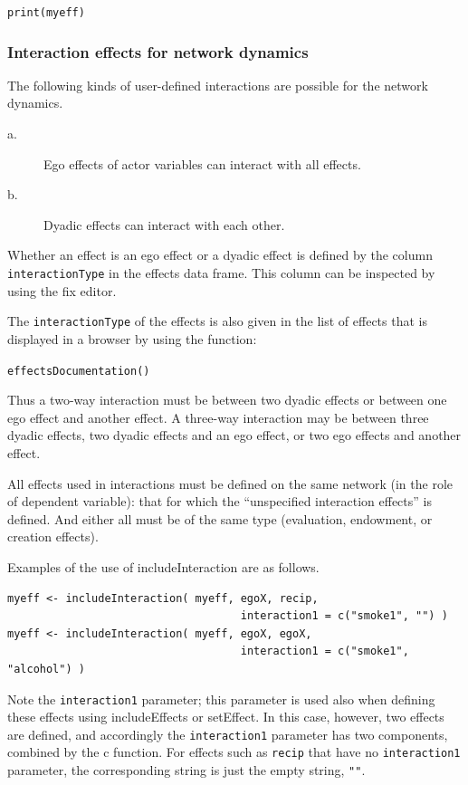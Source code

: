 \documentclass[a4paper,fleqn,11pt]{article}
\newcommand{\+}{\, + \,}
\newcommand{\sfn}[1]{\textsf{#1}}
\begin{document}
\verb|print(myeff)| \\


\subsubsection{Interaction effects for network dynamics}

The following kinds of user-defined interactions are possible
for the network dynamics.
\begin{description}
\item[a.]
  Ego effects of actor variables can interact with all effects.
  \item[b.] Dyadic effects can interact with each other.
\end{description}
Whether an effect is an ego effect or a dyadic effect is defined by
the column \texttt{interactionType} in the effects data frame.
This column can be inspected by using the \sfn{fix} editor.

The \texttt{interactionType} of the effects is also given in
the list of effects that is displayed in a browser
by using the function:

\verb|effectsDocumentation()| \\
\bigskip

Thus a two-way interaction must be between two dyadic effects or between one
ego effect and another effect. A three-way interaction may be between three
dyadic effects, two dyadic effects and an ego effect, or two ego effects and
another effect.

All effects used in interactions must be defined on the same network
(in the role of dependent variable): that for
which the ``unspecified
interaction effects'' is defined.  And either all must be
of the same type (evaluation, endowment, or creation effects).

Examples of the use of \sfn{includeInteraction} are as follows.
\begin{verbatim}
myeff <- includeInteraction( myeff, egoX, recip,
                                    interaction1 = c("smoke1", "") )
myeff <- includeInteraction( myeff, egoX, egoX,
                                    interaction1 = c("smoke1", "alcohol") )
\end{verbatim}
Note the \texttt{interaction1} parameter; this parameter is used also
when defining these effects using \sfn{includeEffects} or
\sfn{setEffect}. In this case, however, two effects are defined,
and accordingly the \texttt{interaction1} parameter has two components,
combined by the \sfn{c} function.
For effects such as \texttt{recip} that have no \texttt{interaction1}
parameter, the corresponding string is just the empty string, \texttt{""}.
\end{document}
